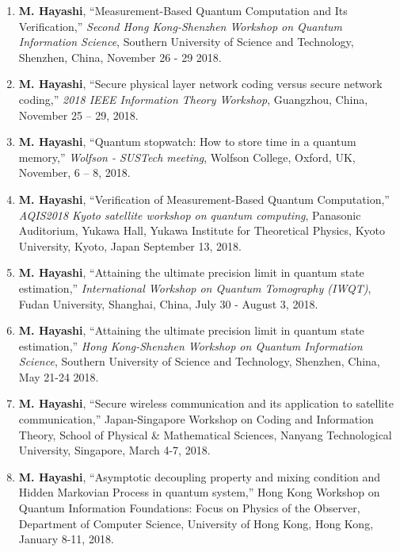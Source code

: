 \documentclass[a4paper,12pt,oneside]{article}
\begin{document}
\begin{enumerate}
\item 
\textbf{M. Hayashi}, 
``Measurement-Based Quantum Computation and Its Verification,''
{\em Second Hong Kong-Shenzhen Workshop on Quantum Information Science}, 
Southern University of Science and Technology, Shenzhen, China,
November 26 - 29 2018.

\item 
\textbf{M. Hayashi}, 
``Secure physical layer network coding versus secure network coding,''
{\em 2018 IEEE Information Theory Workshop}, 
Guangzhou, China, November 25 -- 29, 2018.

\item 
\textbf{M. Hayashi}, 
``Quantum stopwatch: How to store time in a quantum memory,''
{\em Wolfson - SUSTech meeting}, 
Wolfson College, Oxford, UK, November, 6 -- 8,  2018.

\item 
\textbf{M. Hayashi}, 
``Verification of Measurement-Based Quantum Computation,''
{\em AQIS2018 Kyoto satellite workshop on quantum computing}, 
Panasonic Auditorium, Yukawa Hall, Yukawa Institute for Theoretical Physics, Kyoto University, Kyoto, Japan
September 13, 2018.

\item 
\textbf{M. Hayashi}, 
``Attaining the ultimate precision limit in quantum state estimation,''
{\em International Workshop on Quantum Tomography (IWQT)}, 
Fudan University, Shanghai, China,
July 30 - August 3, 2018.


\item 
\textbf{M. Hayashi}, 
``Attaining the ultimate precision limit in quantum state estimation,''
{\em Hong Kong-Shenzhen Workshop on Quantum Information Science}, 
Southern University of Science and Technology, Shenzhen, China,
May 21-24 2018.

\item 
\textbf{M. Hayashi}, ``Secure wireless communication and its application to 
satellite communication,'' 
Japan-Singapore Workshop on Coding and Information Theory, 
School of Physical \& Mathematical Sciences,
Nanyang Technological University,
Singapore, March 4-7, 2018.


\item 
\textbf{M. Hayashi}, ``Asymptotic decoupling property and mixing condition 
and Hidden Markovian Process in quantum system,'' 
Hong Kong Workshop on Quantum Information Foundations:
Focus on Physics of the Observer, 
Department of Computer Science, University of Hong Kong, 
Hong Kong, January 8-11, 2018.


\end{enumerate}
\end{document}
